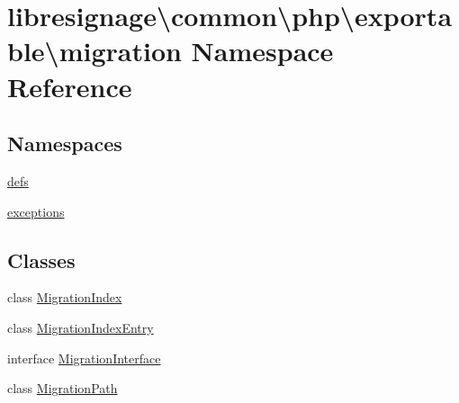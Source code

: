 \hypertarget{namespacelibresignage_1_1common_1_1php_1_1exportable_1_1migration}{}\section{libresignage\textbackslash{}common\textbackslash{}php\textbackslash{}exportable\textbackslash{}migration Namespace Reference}
\label{namespacelibresignage_1_1common_1_1php_1_1exportable_1_1migration}
\subsection*{Namespaces}
\begin{DoxyCompactItemize}
\item 
 \hyperlink{namespacelibresignage_1_1common_1_1php_1_1exportable_1_1migration_1_1defs}{defs}
\item 
 \hyperlink{namespacelibresignage_1_1common_1_1php_1_1exportable_1_1migration_1_1exceptions}{exceptions}
\end{DoxyCompactItemize}
\subsection*{Classes}
\begin{DoxyCompactItemize}
\item 
class \hyperlink{classlibresignage_1_1common_1_1php_1_1exportable_1_1migration_1_1MigrationIndex}{Migration\+Index}
\item 
class \hyperlink{classlibresignage_1_1common_1_1php_1_1exportable_1_1migration_1_1MigrationIndexEntry}{Migration\+Index\+Entry}
\item 
interface \hyperlink{interfacelibresignage_1_1common_1_1php_1_1exportable_1_1migration_1_1MigrationInterface}{Migration\+Interface}
\item 
class \hyperlink{classlibresignage_1_1common_1_1php_1_1exportable_1_1migration_1_1MigrationPath}{Migration\+Path}
\end{DoxyCompactItemize}
